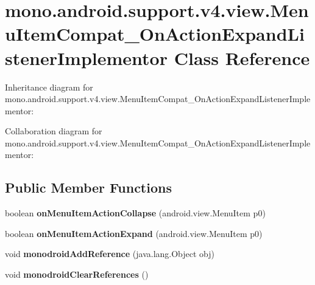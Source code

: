 \hypertarget{classmono_1_1android_1_1support_1_1v4_1_1view_1_1_menu_item_compat___on_action_expand_listener_implementor}{}\section{mono.\+android.\+support.\+v4.\+view.\+Menu\+Item\+Compat\+\_\+\+On\+Action\+Expand\+Listener\+Implementor Class Reference}
\label{classmono_1_1android_1_1support_1_1v4_1_1view_1_1_menu_item_compat___on_action_expand_listener_implementor}


Inheritance diagram for mono.\+android.\+support.\+v4.\+view.\+Menu\+Item\+Compat\+\_\+\+On\+Action\+Expand\+Listener\+Implementor\+:


Collaboration diagram for mono.\+android.\+support.\+v4.\+view.\+Menu\+Item\+Compat\+\_\+\+On\+Action\+Expand\+Listener\+Implementor\+:
\subsection*{Public Member Functions}
\begin{DoxyCompactItemize}
\item 
\mbox{\label{classmono_1_1android_1_1support_1_1v4_1_1view_1_1_menu_item_compat___on_action_expand_listener_implementor_a9ea5677e5f21bf5c3aa69d8242db44aa}} 
boolean {\bfseries on\+Menu\+Item\+Action\+Collapse} (android.\+view.\+Menu\+Item p0)
\item 
\mbox{\label{classmono_1_1android_1_1support_1_1v4_1_1view_1_1_menu_item_compat___on_action_expand_listener_implementor_adc73b3f61a71f2de8c3fe9e578c58463}} 
boolean {\bfseries on\+Menu\+Item\+Action\+Expand} (android.\+view.\+Menu\+Item p0)
\item 
\mbox{\label{classmono_1_1android_1_1support_1_1v4_1_1view_1_1_menu_item_compat___on_action_expand_listener_implementor_ae1594db9eea57bbf63d3077de01f3c24}} 
void {\bfseries monodroid\+Add\+Reference} (java.\+lang.\+Object obj)
\item 
\mbox{\label{classmono_1_1android_1_1support_1_1v4_1_1view_1_1_menu_item_compat___on_action_expand_listener_implementor_a725ef56bb9745c14ea40b598752c24c3}} 
void {\bfseries monodroid\+Clear\+References} ()
\end{DoxyCompactItemize}
